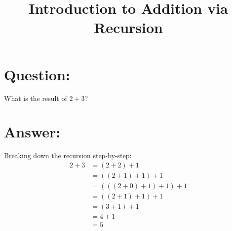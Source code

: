 \documentclass{article}
\title{Introduction to Addition via Recursion}
\author{}
\date{}
\begin{document}
\section{Question:}
What is the result of \( 2 + 3 \)?
\section{Answer:}
Breaking down the recursion step-by-step:
\[
    \begin{aligned}
        2 + 3 & = (2 + 2) + 1             \\
              & = ((2 + 1) + 1) + 1       \\
              & = (((2 + 0) + 1) + 1) + 1 \\
              & = ((2 + 1) + 1) + 1       \\
              & = (3 + 1) + 1             \\
              & = 4 + 1                   \\
              & = 5
    \end{aligned}
\]
\end{document}
